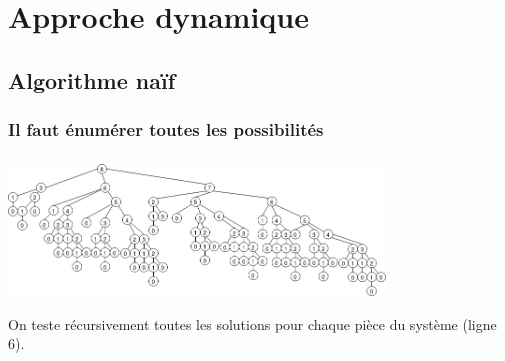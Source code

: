 \documentclass[svgnames,11pt]{beamer}
\begin{document}
\section{Approche dynamique}
\subsection{Algorithme naïf}
\begin{frame}[fragile]
    \frametitle{Il faut énumérer toutes les possibilités}

    \begin{center}
        
        \label{naif}
    \end{center}

\end{frame}

\begin{frame}
    \frametitle{}

    \begin{center}
        \centering
        \includegraphics[width=10cm]{ressources/appel-naif-8.png}
        \label{IMG}
    \end{center}
On teste récursivement toutes les solutions pour chaque pièce du système (ligne 6).
\end{frame}
\end{document}
